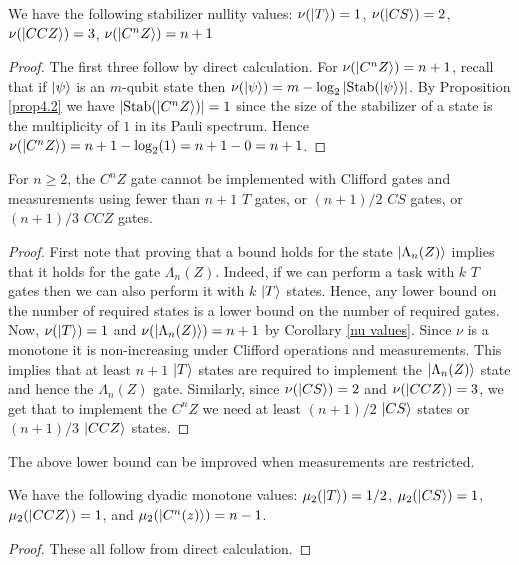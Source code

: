 \documentclass[12pt]{dalthesis}
\begin{document}
\begin{corollary}
\label{nu values}
We have the following stabilizer nullity values: $\nu (\ket{T}) = 1$, $\nu (\ket{CS}) = 2$, $\nu (\ket{CCZ}) = 3$, $\nu (\ket{C^n Z}) = n+1$
\end{corollary}
\begin{proof}

The first three follow by direct calculation. For $\nu (\ket{C^n Z}) = n+1$, recall that if $\ket{\psi}$ is an $m$-qubit state then $\nu
(\ket{\psi}) = m - \log_2|\mathrm{Stab}(\ket{\psi})|$. By
Proposition \ref{prop4.2} we have $|\mathrm{Stab}(\ket{C^n Z})| = 1$ since the size of the stabilizer of a state is the multiplicity of $1$ in its Pauli spectrum. Hence $\nu (\ket{C^n Z}) = n+1 - \log_2 (1) = n+1-0 = n+1$.
\end{proof}

\begin{proposition}
\label{nullity(C^nZ) LB}
For $n \geq 2$, the $C^n Z$ gate cannot be implemented with Clifford gates and measurements using fewer than $n+1$ $T$ gates, or $(n+1)/2$ $CS$ gates, or $(n+1)/3$ $CCZ$ gates.
\end{proposition}

\begin{proof}
First note that proving that a bound holds for the state $\ket{\Lambda_n (Z)}$ implies that it holds for the gate $\Lambda_n (Z)$. Indeed, if we can perform a task with $k$ $T$ gates then we can also perform it with $k$ $\ket{T}$ states. Hence, any lower bound on the number of required states is a lower bound on the number of required gates. Now, $\nu (\ket{T}) = 1$ and $\nu (\ket{\Lambda_n (Z)}) = n+1$ by Corollary \ref{nu values}. Since $\nu$ is a monotone it is non-increasing under Clifford operations and measurements. This implies that at least $n+1$ $\ket{T}$ states are required to implement the $\ket{\Lambda_n (Z)}$ state and hence the $\Lambda_n (Z)$ gate. Similarly, since $\nu (\ket{CS}) = 2$ and $\nu (\ket{CCZ}) = 3$, we get that to implement the $C^n Z$ we need at least $(n+1)/2$ $\ket{CS}$ states or $(n+1)/3$ $\ket{CCZ}$ states.
\end{proof}

The above lower bound can be improved when measurements are restricted.

\begin{corollary}
\label{dyadic values}
We have the following dyadic monotone values: $\mu_2 (\ket{T}) = 1/2$, $\mu_2 (\ket{CS}) = 1$, $\mu_2 (\ket{CCZ}) = 1$, and $\mu_2 (\ket{C^n(z)}) = n-1$.
\end{corollary}
\begin{proof}
These all follow from direct calculation.
\end{proof}
\end{document}
